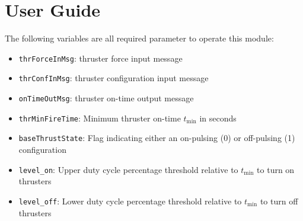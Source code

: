 
\section{User Guide}
The following variables are all required parameter to operate this module:
\begin{itemize}
	\item {\tt thrForceInMsg}:  thruster force input message
	\item {\tt thrConfInMsg}:   thruster configuration input message
	\item {\tt onTimeOutMsg}:   thruster on-time output message
	\item {\tt thrMinFireTime}:  Minimum thruster on-time $t_{\text{min}}$ in seconds
	\item {\tt baseThrustState}:  Flag indicating either an on-pulsing (0) or off-pulsing (1) configuration
	\item {\tt level\_on}:   Upper duty cycle percentage threshold relative to $t_{\text{min}}$ to turn on thrusters
	\item {\tt level\_off}:  Lower duty cycle percentage threshold relative to $t_{\text{min}}$ to turn off thrusters
\end{itemize}
